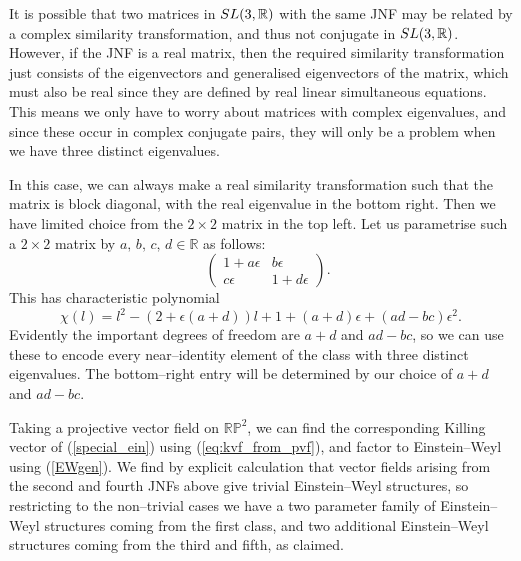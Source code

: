 It is possible that two matrices in $SL(3,\mathbb{R})$ with the same JNF may be related by a complex similarity transformation, and thus not conjugate in $SL(3,\mathbb{R})$. However, if the JNF is a real matrix, then the required similarity transformation just consists of the eigenvectors and generalised eigenvectors of the matrix, which must also be real since they are defined by real linear simultaneous equations. This means we only have to worry about matrices with complex eigenvalues, and since these occur in complex conjugate pairs, they will only be a problem when we have three distinct eigenvalues.

In this case, we can always make a real similarity transformation such that the matrix is block diagonal, with the real eigenvalue in the bottom right. Then we have limited choice from the $2\times 2$ matrix in the top left. Let us parametrise such a $2\times 2$ matrix by $a,\,b,\,c,\,d\in\mathbb{R}$ as follows:
\[
\quad
\begin{pmatrix}1+a\epsilon & b\epsilon \\
c\epsilon & 1+d\epsilon 
\end{pmatrix}.
\]
This has characteristic polynomial
\[
\chi( l)= l^2-(2+\epsilon(a+d)) l+1+(a+d)\epsilon+(ad-bc)\epsilon^2.
\]
Evidently the important degrees of freedom are $a+d$ and $ad-bc$, so we can use these to encode every near--identity element of the class with three distinct eigenvalues. The bottom--right entry will be determined by our choice of $a+d$ and $ad-bc$.

Taking a projective vector field on $\mathbb{RP}^2$, we can find the corresponding Killing vector of (\ref{special_ein}) using (\ref{eq:kvf_from_pvf}), and factor to Einstein--Weyl using (\ref{EWgen}). We find by explicit calculation that vector fields arising from the second and fourth JNFs above give trivial Einstein--Weyl structures, so restricting to the non--trivial cases we have a two parameter family of Einstein--Weyl structures coming from the first class, and two additional Einstein--Weyl structures coming from the third and fifth, as claimed.
\koniec


